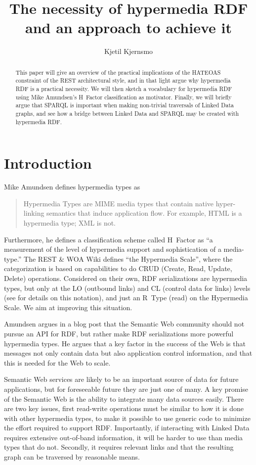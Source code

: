 \documentclass{llncs}
\title{The necessity of hypermedia RDF and an approach to achieve it}
\author{Kjetil Kjernsmo\inst{1}}
\institute{Department of Informatics,
Postboks 1080 Blindern,
0316 Oslo, Norway
\email{kjekje@ifi.uio.no}}
\begin{document}
\maketitle



\begin{abstract}
This paper will give an overview of the practical implications of the
HATEOAS constraint of the REST architectural style, and in that light argue why
hypermedia RDF is a practical necessity. We will then sketch a
vocabulary for hypermedia RDF using Mike Amundsen's H~Factor
classification as motivator. Finally, we will briefly argue that
SPARQL is important when making non-trivial traversals of Linked Data
graphs, and see how a bridge between Linked Data and SPARQL may be
created with hypermedia RDF.
\end{abstract}

\section{Introduction}

Mike Amundsen defines hypermedia types\cite{hypermediatypes} as 
\begin{quote}
Hypermedia Types are MIME media types that contain native
hyper-linking semantics that induce application flow. For example,
HTML is a hypermedia type; XML is not.
\end{quote}
Furthermore, he defines a classification scheme called H~Factor as ``a
measurement of the level of hypermedia support and sophistication of a
media-type.'' The REST \& WOA Wiki defines ``the Hypermedia
Scale''\cite{hypermediascale},
where the categorization is based on capabilities to do CRUD (Create,
Read, Update, Delete) operations.  Considered on their own, RDF
serializations are hypermedia types, but only at the \textsf{LO}
(outbound links) and \textsf{CL} (control data for links) levels (see
\cite{hypermediatypes} for details on this notation), and just an R~Type (read) on
the Hypermedia Scale. We aim at improving this situation.

Amundsen argues in a blog
post\cite{nordfapi} that the
Semantic Web community should not pursue an API for RDF, but rather
make RDF serializations more powerful hypermedia types. He argues that
a key factor in the success of the Web is that messages not only
contain data but also application control information, and that this is
needed for the Web to scale.

Semantic Web services are likely to be an important source of data for
future applications, but for foreseeable future they are just one of many. A
key promise of the Semantic Web is the ability to integrate many data
sources easily. There are two key issues, first read-write operations
must be similar to how it is done with other hypermedia types, to make
it possible to use generic code to minimize the effort required to
support RDF. Importantly, if interacting with Linked Data requires
extensive out-of-band information, it will be harder to use than media
types that do not. Secondly, it requires relevant links and that the
resulting graph can be traversed by reasonable means.
\end{document}
